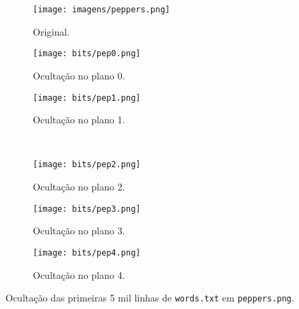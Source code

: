 \begin{figure}[H]
    \centering
    \begin{subfigure}{0.33\textwidth}
        \centering
        \texttt{[image: imagens/peppers.png]}
        \caption{Original.}
    \end{subfigure}%
    \begin{subfigure}{0.33\textwidth}
        \centering
        \texttt{[image: bits/pep0.png]}
        \caption{Ocultação no plano 0.}
    \end{subfigure}
    \begin{subfigure}{0.33\textwidth}
        \centering
        \texttt{[image: bits/pep1.png]}
        \caption{Ocultação no plano 1.}
    \end{subfigure}\\[8pt]
    \begin{subfigure}{0.33\textwidth}
        \centering
        \texttt{[image: bits/pep2.png]}
        \caption{Ocultação no plano 2.}
    \end{subfigure}%
    \begin{subfigure}{0.33\textwidth}
        \centering
        \texttt{[image: bits/pep3.png]}
        \caption{Ocultação no plano 3.}
    \end{subfigure}%
    \begin{subfigure}{0.33\textwidth}
        \centering
        \texttt{[image: bits/pep4.png]}
        \caption{Ocultação no plano 4.}
    \end{subfigure}

    \caption{Ocultação das primeiras 5 mil linhas de \texttt{words.txt} em \texttt{peppers.png}.}
    \label{fig:peppers}
\end{figure}